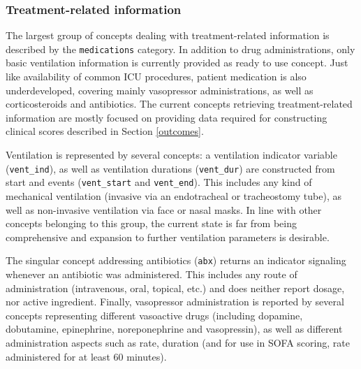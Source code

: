 \documentclass[
  notitle]{jss}
\begin{document}
\hypertarget{treatment-related-information}{%
\subsubsection{Treatment-related
information}\label{treatment-related-information}}

The largest group of concepts dealing with treatment-related information
is described by the \texttt{medications} category. In addition to drug
administrations, only basic ventilation information is currently
provided as ready to use concept. Just like availability of common ICU
procedures, patient medication is also underdeveloped, covering mainly
vasopressor administrations, as well as corticosteroids and antibiotics.
The current concepts retrieving treatment-related information are mostly
focused on providing data required for constructing clinical scores
described in Section \ref{outcomes}.

Ventilation is represented by several concepts: a ventilation indicator
variable (\texttt{vent\_ind}), as well as ventilation durations
(\texttt{vent\_dur}) are constructed from start and events
(\texttt{vent\_start} and \texttt{vent\_end}). This includes any kind of
mechanical ventilation (invasive via an endotracheal or tracheostomy
tube), as well as non-invasive ventilation via face or nasal masks. In
line with other concepts belonging to this group, the current state is
far from being comprehensive and expansion to further ventilation
parameters is desirable.

The singular concept addressing antibiotics (\texttt{abx}) returns an
indicator signaling whenever an antibiotic was administered. This
includes any route of administration (intravenous, oral, topical, etc.)
and does neither report dosage, nor active ingredient. Finally,
vasopressor administration is reported by several concepts representing
different vasoactive drugs (including dopamine, dobutamine, epinephrine,
noreponephrine and vasopressin), as well as different administration
aspects such as rate, duration (and for use in SOFA scoring, rate
administered for at least 60 minutes).
\end{document}
